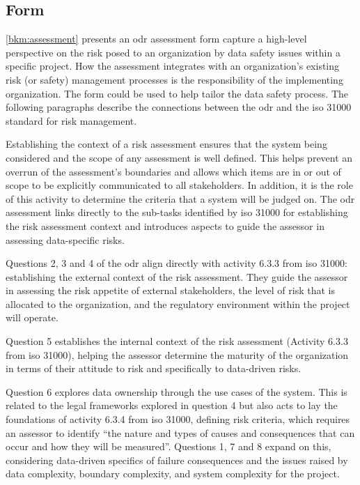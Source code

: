 \subsection{ Form}
\autoref{bkm:assessment} presents an \gls{odr} assessment form capture a high-level perspective on the risk posed to an organization by data safety issues within a specific project. How the assessment integrates with an organization's existing risk (or safety) management processes is the responsibility of the implementing organization. The form could be used to help tailor the data safety process. The following paragraphs describe the connections between the \gls{odr} and the
\gls{iso} 31000 \cite{citation:iso310002018risk}
standard for risk management.

Establishing the context of a risk assessment ensures that the system being considered and the scope of any assessment is well defined. This helps prevent an overrun of the assessment's boundaries and allows which items are in or out of scope to be explicitly communicated to all \glspl{stakeholder}. In addition, it is the role of this activity to determine the criteria that a system will be judged on. The \gls{odr} assessment links directly to the sub-tasks identified by \gls{iso} 31000 for establishing the risk assessment context and introduces aspects to guide the assessor in assessing  data-specific risks.

Questions 2, 3 and 4 of the \gls{odr} align directly with activity 6.3.3 from \gls{iso} 31000: establishing the external context of the risk assessment.
They guide the assessor in assessing the risk appetite of external \glspl{stakeholder}, the level of risk that is allocated to the organization, and the regulatory environment within the project will operate.

Question 5 establishes the internal context of the risk assessment (Activity 6.3.3 from \gls{iso} 31000),
helping the assessor determine the maturity of the organization in terms of their attitude to risk and specifically to data-driven risks.

Question 6 explores data ownership through the use cases of the system. This is related to the legal frameworks explored in question 4 but also acts to lay the foundations of activity 6.3.4 from \gls{iso} 31000,
defining risk criteria, which requires an assessor to identify ``the nature and types of causes and consequences that can occur and how they will be measured''. Questions 1, 7 and 8 expand on this, considering data-driven specifics of failure consequences and the issues raised by data complexity, boundary complexity, and system complexity for the project.

